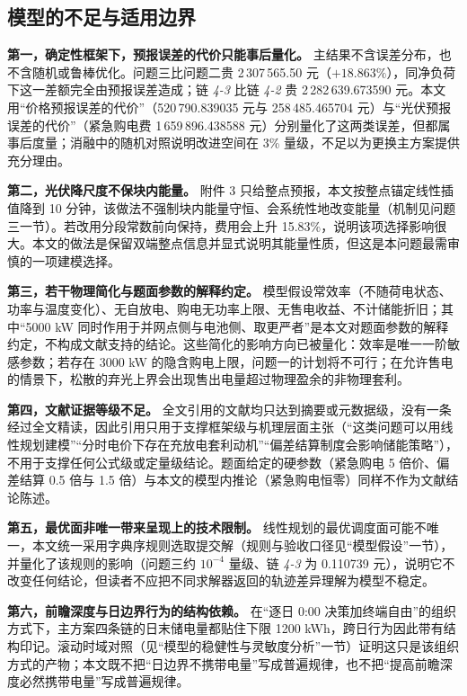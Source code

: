 \subsection{模型的不足与适用边界}

\textbf{第一，确定性框架下，预报误差的代价只能事后量化。} 主结果不含误差分布，也不含随机或鲁棒优化。问题三比问题二贵 2\,307\,565.50 元（$+18.863\%$），同净负荷下这一差额完全由预报误差造成；链 \emph{4-3} 比链 \emph{4-2} 贵 2\,282\,639.673590 元。本文用“价格预报误差的代价”（520\,790.839035 元与 258\,485.465704 元）与“光伏预报误差的代价”（紧急购电费 1\,659\,896.438588 元）分别量化了这两类误差，但都属事后度量；消融中的随机对照说明改进空间在 3\% 量级，不足以为更换主方案提供充分理由。

\textbf{第二，光伏降尺度不保块内能量。} 附件 3 只给整点预报，本文按整点锚定线性插值降到 10 分钟，该做法不强制块内能量守恒、会系统性地改变能量（机制见问题三一节）。若改用分段常数前向保持，费用会上升 15.83\%，说明该项选择影响很大。本文的做法是保留双端整点信息并显式说明其能量性质，但这是本问题最需审慎的一项建模选择。

\textbf{第三，若干物理简化与题面参数的解释约定。} 模型假设常效率（不随荷电状态、功率与温度变化）、无自放电、购电无功率上限、无售电收益、不计储能折旧；其中“5000 kW 同时作用于并网点侧与电池侧、取更严者”是本文对题面参数的解释约定，不构成文献支持的结论。这些简化的影响方向已被量化：效率是唯一一阶敏感参数；若存在 3000 kW 的隐含购电上限，问题一的计划将不可行；在允许售电的情景下，松散的弃光上界会出现售出电量超过物理盈余的非物理套利。

\textbf{第四，文献证据等级不足。} 全文引用的文献均只达到摘要或元数据级，没有一条经过全文精读，因此引用只用于支撑框架级与机理层面主张（“这类问题可以用线性规划建模”“分时电价下存在充放电套利动机”“偏差结算制度会影响储能策略”），不用于支撑任何公式级或定量级结论。题面给定的硬参数（紧急购电 5 倍价、偏差结算 0.5 倍与 1.5 倍）与本文的模型内推论（紧急购电恒零）同样不作为文献结论陈述。

\textbf{第五，最优面非唯一带来呈现上的技术限制。} 线性规划的最优调度面可能不唯一，本文统一采用字典序规则选取提交解（规则与验收口径见“模型假设”一节），并量化了该规则的影响（问题三约 $10^{-4}$ 量级、链 \emph{4-3} 为 0.110739 元），说明它不改变任何结论，但读者不应把不同求解器返回的轨迹差异理解为模型不稳定。

\textbf{第六，前瞻深度与日边界行为的结构依赖。} 在“逐日 0:00 决策加终端自由”的组织方式下，主方案四条链的日末储电量都贴住下限 1200 kWh，跨日行为因此带有结构印记。滚动时域对照（见“模型的稳健性与灵敏度分析”一节）证明这只是该组织方式的产物；本文既不把“日边界不携带电量”写成普遍规律，也不把“提高前瞻深度必然携带电量”写成普遍规律。

